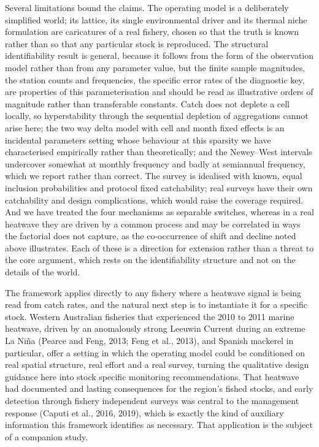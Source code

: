 \documentclass[
  11pt,
  a4paper,
]{article}
\begin{document}
Several limitations bound the claims. The operating model is a
deliberately simplified world; its lattice, its single environmental
driver and its thermal niche formulation are caricatures of a real
fishery, chosen so that the truth is known rather than so that any
particular stock is reproduced. The structural identifiability result is
general, because it follows from the form of the observation model
rather than from any parameter value, but the finite sample magnitudes,
the station counts and frequencies, the specific error rates of the
diagnostic key, are properties of this parameterisation and should be
read as illustrative orders of magnitude rather than transferable
constants. Catch does not deplete a cell locally, so hyperstability
through the sequential depletion of aggregations cannot arise here; the
two way delta model with cell and month fixed effects is an incidental
parameters setting whose behaviour at this sparsity we have
characterised empirically rather than theoretically; and the Newey--West
intervals undercover somewhat at monthly frequency and badly at
semiannual frequency, which we report rather than correct. The survey is
idealised with known, equal inclusion probabilities and protocol fixed
catchability; real surveys have their own catchability and design
complications, which would raise the coverage required. And we have
treated the four mechanisms as separable switches, whereas in a real
heatwave they are driven by a common process and may be correlated in
ways the factorial does not capture, as the co-occurrence of shift and
decline noted above illustrates. Each of these is a direction for
extension rather than a threat to the core argument, which rests on the
identifiability structure and not on the details of the world.

The framework applies directly to any fishery where a heatwave signal is
being read from catch rates, and the natural next step is to instantiate
it for a specific stock. Western Australian fisheries that experienced
the 2010 to 2011 marine heatwave, driven by an anomalously strong
Leeuwin Current during an extreme La Niña (Pearce and Feng, 2013; Feng
et al., 2013), and Spanish mackerel in particular, offer a setting in
which the operating model could be conditioned on real spatial
structure, real effort and a real survey, turning the qualitative design
guidance here into stock specific monitoring recommendations. That
heatwave had documented and lasting consequences for the region's fished
stocks, and early detection through fishery independent surveys was
central to the management response (Caputi et al., 2016, 2019), which is
exactly the kind of auxiliary information this framework identifies as
necessary. That application is the subject of a companion study.
\end{document}
